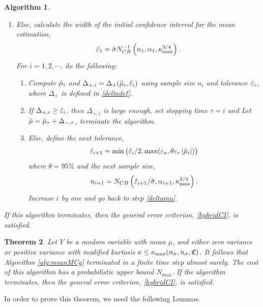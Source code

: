 \documentclass{iitthesis}
\newtheorem{theorem}{Theorem}[section]
\newtheorem{algorithm}[theorem]{Algorithm}
\begin{document}
\begin{algorithm}
\begin{enumerate}
$$n = N_{CB}\left(\varepsilon_a/\hsigma,\alpha_1,\kappa_{\max}^{3/4}\right).$$ Then, compute $\tmu$ using $n$ samples, terminate the algorithm.
\item Else, calculate the width of the initial confidence interval for the mean estimation,
\begin{align}\label{eps1def}
\hat{\varepsilon}_1=\hat{\sigma} N_{CB}^{-1}\left(n_1,\alpha_1,\kappa_{\max}^{3/4}\right).
\end{align}
For $i = 1,2,\cdots$, do the following:
\begin{enumerate}
\item  \label{deltamu}Compute $\hat{\mu}_i$ and $\Delta_{+,i}=\Delta_{+}(\hat{\mu}_i,\hat{\varepsilon}_i)$ using sample size $n_i$ and tolerance $\hat{\varepsilon}_i$, where $\Delta_{+}$ is defined in \eqref{deltadef}.
\item If $\Delta_{+,i} \geq  \hat{\varepsilon}_i$, then $\Delta_{+,i}$ is large enough, set stopping time $\tau = i$ and Let $\tilde{\mu} = \hat{\mu}_{\tau}+\Delta_{-, \tau}$, terminate the algorithm.
\item Else, define the next tolerance, $$\hat{\varepsilon}_{i+1} = \min\left(\hat{\varepsilon}_i/2, \max(\varepsilon_a,\theta\varepsilon_r\left \lvert \hat{\mu}_i \right \rvert)\right)$$ where $\theta = 95\%$ and the next sample size, $$n_{i+1} = N_{CB}\left(\hat{\varepsilon}_{i+1}/\hat{\sigma},\alpha_{i+1},\kappa_{\max}^{3/4}\right).$$ Increase $i$ by one and go back to step \ref{deltamu}. 
\end{enumerate}
\end{enumerate}
If this algorithm terminates, then the general error criterion, \eqref{hybridCI}, is satisfied.
\end{algorithm}

\begin{theorem}\label{thm:meanMCg}
Let $Y$ be a random variable with mean $\mu$, and either zero variance or positive variance with modified kurtosis $\kappa \leq \kappa_{\max}(\alpha_\sigma, n_\sigma, \mathfrak{C})$. It follows that Algorithm \ref{alg:meanMCg} terminated in a finite time step almost surely. The cost of this algorithm has a probabilistic upper bound $N_{\max}$. If the algorithm terminates, then the general error criterion, \eqref{hybridCI}, is satisfied.
\end{theorem}
In order to prove this theorem, we need the following Lemmas.
\end{document}
